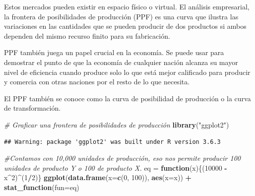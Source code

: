 \documentclass[
]{article}
\newenvironment{Shaded}{\begin{snugshade}}{\end{snugshade}}
\newcommand{\CommentTok}[1]{\textcolor[rgb]{0.56,0.35,0.01}{\textit{#1}}}
\newcommand{\ControlFlowTok}[1]{\textcolor[rgb]{0.13,0.29,0.53}{\textbf{#1}}}
\newcommand{\DataTypeTok}[1]{\textcolor[rgb]{0.13,0.29,0.53}{#1}}
\newcommand{\DecValTok}[1]{\textcolor[rgb]{0.00,0.00,0.81}{#1}}
\newcommand{\KeywordTok}[1]{\textcolor[rgb]{0.13,0.29,0.53}{\textbf{#1}}}
\newcommand{\NormalTok}[1]{#1}
\newcommand{\OperatorTok}[1]{\textcolor[rgb]{0.81,0.36,0.00}{\textbf{#1}}}
\newcommand{\StringTok}[1]{\textcolor[rgb]{0.31,0.60,0.02}{#1}}
\begin{document}
Estos mercados pueden existir en espacio físico o virtual. El análisis
empresarial, la frontera de posibilidades de producción (PPF) es una
curva que ilustra las variaciones en las cantidades que se pueden
producir de dos productos si ambos dependen del mismo recurso finito
para su fabricación.

PPF también juega un papel crucial en la economía. Se puede usar para
demostrar el punto de que la economía de cualquier nación alcanza su
mayor nivel de eficiencia cuando produce solo lo que está mejor
calificado para producir y comercia con otras naciones por el resto de
lo que necesita.

El PPF también se conoce como la curva de posibilidad de producción o la
curva de transformación.

\begin{Shaded}
\begin{Highlighting}[]
\CommentTok{# Graficar una frontera de posibilidades de producción}
\KeywordTok{library}\NormalTok{(}\StringTok{"ggplot2"}\NormalTok{)}
\end{Highlighting}
\end{Shaded}

\begin{verbatim}
## Warning: package 'ggplot2' was built under R version 3.6.3
\end{verbatim}

\begin{Shaded}
\begin{Highlighting}[]
\CommentTok{#Contamos con 10,000 unidades de producción, eso nos permite producir 100 unidades de producto Y o 100 de producto X.}
\NormalTok{eq =}\StringTok{ }\ControlFlowTok{function}\NormalTok{(x)\{(}\DecValTok{10000} \OperatorTok{-}\StringTok{ }\NormalTok{x}\OperatorTok{^}\DecValTok{2}\NormalTok{)}\OperatorTok{^}\NormalTok{(}\DecValTok{1}\OperatorTok{/}\DecValTok{2}\NormalTok{)\}}
\KeywordTok{ggplot}\NormalTok{(}\KeywordTok{data.frame}\NormalTok{(}\DataTypeTok{x=}\KeywordTok{c}\NormalTok{(}\DecValTok{0}\NormalTok{, }\DecValTok{100}\NormalTok{)), }\KeywordTok{aes}\NormalTok{(}\DataTypeTok{x=}\NormalTok{x)) }\OperatorTok{+}\StringTok{ }
\StringTok{  }\KeywordTok{stat_function}\NormalTok{(}\DataTypeTok{fun=}\NormalTok{eq)}
\end{Highlighting}
\end{Shaded}
\end{document}
